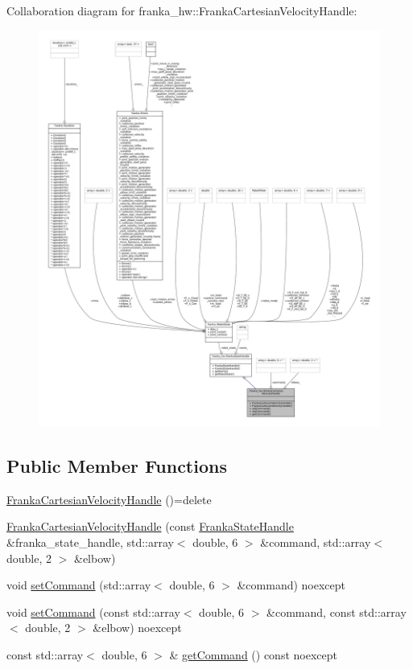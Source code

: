 Collaboration diagram for franka\+\_\+hw\+:\+:Franka\+Cartesian\+Velocity\+Handle\+:
\nopagebreak
\begin{figure}[H]
\begin{center}
\leavevmode
\includegraphics[width=350pt]{classfranka__hw_1_1FrankaCartesianVelocityHandle__coll__graph}
\end{center}
\end{figure}
\subsection*{Public Member Functions}
\begin{DoxyCompactItemize}
\item 
\hyperlink{classfranka__hw_1_1FrankaCartesianVelocityHandle_adf7bcf3b81150001bbed8799629b9f60}{Franka\+Cartesian\+Velocity\+Handle} ()=delete
\item 
\hyperlink{classfranka__hw_1_1FrankaCartesianVelocityHandle_ab58f21f67fbba0bc10a2e32e98c3e5ef}{Franka\+Cartesian\+Velocity\+Handle} (const \hyperlink{classfranka__hw_1_1FrankaStateHandle}{Franka\+State\+Handle} \&franka\+\_\+state\+\_\+handle, std\+::array$<$ double, 6 $>$ \&command, std\+::array$<$ double, 2 $>$ \&elbow)
\item 
void \hyperlink{classfranka__hw_1_1FrankaCartesianVelocityHandle_a8087142ef5b8fedeae8930f01dfd4a07}{set\+Command} (std\+::array$<$ double, 6 $>$ \&command) noexcept
\item 
void \hyperlink{classfranka__hw_1_1FrankaCartesianVelocityHandle_aaf139dd23a7d9784a7cc74c6eaca4b9c}{set\+Command} (const std\+::array$<$ double, 6 $>$ \&command, const std\+::array$<$ double, 2 $>$ \&elbow) noexcept
\item 
const std\+::array$<$ double, 6 $>$ \& \hyperlink{classfranka__hw_1_1FrankaCartesianVelocityHandle_a64a89a403d36122a8ea553600ea94894}{get\+Command} () const noexcept
\end{DoxyCompactItemize}
